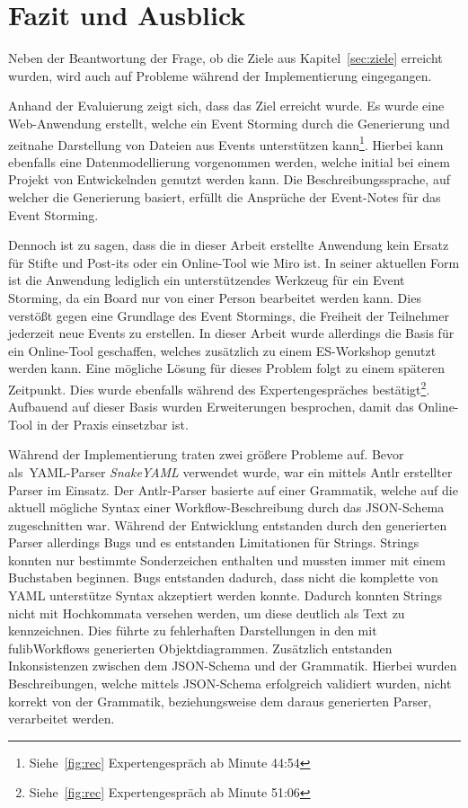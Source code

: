 \chapter{Fazit und Ausblick}\label{ch:fazit}

Neben der Beantwortung der Frage, ob die Ziele aus Kapitel~\ref{sec:ziele} erreicht wurden, wird auch auf Probleme während
der Implementierung eingegangen.

Anhand der Evaluierung zeigt sich, dass das Ziel erreicht wurde.
Es wurde eine Web-Anwendung erstellt, welche ein Event Storming durch die Generierung und zeitnahe Darstellung von Dateien aus Events unterstützen kann\footnote{Siehe~\ref{fig:rec} Expertengespräch ab Minute  44:54}.
Hierbei kann ebenfalls eine Datenmodellierung vorgenommen werden, welche initial bei einem Projekt von Entwickelnden genutzt werden kann.
Die Beschreibungssprache, auf welcher die Generierung basiert, erfüllt die Ansprüche der Event-Notes für das Event Storming.

Dennoch ist zu sagen, dass die in dieser Arbeit erstellte Anwendung kein Ersatz für Stifte und Post-its\textsuperscript{\textregistered} oder ein Online-Tool wie Miro ist.
In seiner aktuellen Form ist die Anwendung lediglich ein unterstützendes Werkzeug für ein Event Storming, da ein Board nur von einer Person bearbeitet werden kann.
Dies verstößt gegen eine Grundlage des Event Stormings, die Freiheit der Teilnehmer jederzeit neue Events zu erstellen.
In dieser Arbeit wurde allerdings die Basis für ein Online-Tool geschaffen, welches zusätzlich zu einem \ac{ES}-Workshop genutzt werden kann.
Eine mögliche Lösung für dieses Problem folgt zu einem späteren Zeitpunkt.
Dies wurde ebenfalls während des Expertengespräches bestätigt\footnote{Siehe~\ref{fig:rec} Expertengespräch ab Minute  51:06}.
Aufbauend auf dieser Basis wurden Erweiterungen besprochen, damit das Online-Tool in der Praxis einsetzbar ist.

Während der Implementierung traten zwei größere Probleme auf.
Bevor als~\ac{YAML}-Parser \textit{SnakeYAML} verwendet wurde, war ein mittels \ac{Antlr} erstellter Parser im Einsatz.
Der \ac{Antlr}-Parser basierte auf einer Grammatik, welche auf die aktuell mögliche Syntax einer Workflow-Beschreibung durch das JSON-Schema zugeschnitten war.
Während der Entwicklung entstanden durch den generierten Parser allerdings Bugs und es entstanden Limitationen für Strings.
Strings konnten nur bestimmte Sonderzeichen enthalten und mussten immer mit einem Buchstaben beginnen.
Bugs entstanden dadurch, dass nicht die komplette von YAML unterstütze Syntax akzeptiert werden konnte.
Dadurch konnten Strings nicht mit Hochkommata versehen werden, um diese deutlich als Text zu kennzeichnen.
Dies führte zu fehlerhaften Darstellungen in den mit fulibWorkflows generierten Objektdiagrammen.\newline
Zusätzlich entstanden Inkonsistenzen zwischen dem JSON-Schema und der Grammatik.
Hierbei wurden Beschreibungen, welche mittels JSON-Schema erfolgreich validiert wurden, nicht korrekt von der Grammatik, beziehungsweise dem daraus generierten Parser, verarbeitet werden.

